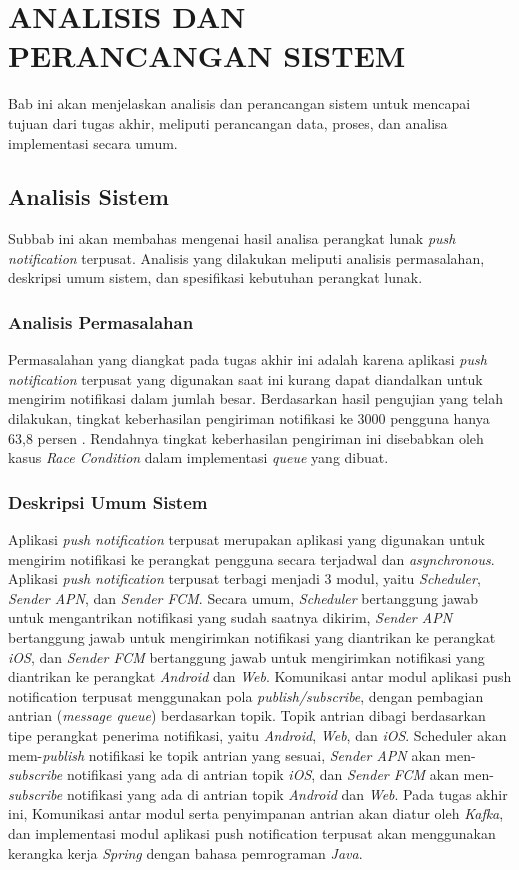 \chapter{ANALISIS DAN PERANCANGAN SISTEM}
Bab ini akan menjelaskan analisis dan perancangan sistem untuk mencapai tujuan dari tugas akhir, meliputi perancangan data, proses, dan analisa implementasi secara umum.

\section{Analisis Sistem}
Subbab ini akan membahas mengenai hasil analisa perangkat lunak \textit{push notification} terpusat. Analisis yang dilakukan meliputi analisis permasalahan, deskripsi umum sistem, dan spesifikasi kebutuhan perangkat lunak.

\subsection{Analisis Permasalahan}
Permasalahan yang diangkat pada tugas akhir ini adalah karena aplikasi \textit{push notification} terpusat yang digunakan saat ini kurang dapat diandalkan untuk mengirim notifikasi dalam jumlah besar. Berdasarkan hasil pengujian yang telah dilakukan, tingkat keberhasilan pengiriman notifikasi ke 3000 pengguna hanya 63,8 persen \cite{application-thesis}. Rendahnya tingkat keberhasilan pengiriman ini disebabkan oleh kasus \textit{Race Condition} dalam implementasi \textit{queue} yang dibuat.

\subsection{Deskripsi Umum Sistem}
Aplikasi \textit{push notification} terpusat merupakan aplikasi yang digunakan untuk mengirim notifikasi ke perangkat pengguna secara terjadwal dan \textit{asynchronous}.
Aplikasi \textit{push notification} terpusat terbagi menjadi 3 modul, yaitu \textit{Scheduler}, \textit{Sender APN}, dan \textit{Sender FCM}. Secara umum, \textit{Scheduler} bertanggung jawab untuk mengantrikan notifikasi yang sudah saatnya dikirim, \textit{Sender APN} bertanggung jawab untuk mengirimkan notifikasi yang diantrikan ke perangkat \textit{iOS}, dan \textit{Sender FCM} bertanggung jawab untuk mengirimkan notifikasi yang diantrikan ke perangkat \textit{Android} dan \textit{Web}.
Komunikasi antar modul aplikasi push notification terpusat menggunakan pola \textit{publish/subscribe}, dengan pembagian antrian (\textit{message queue}) berdasarkan topik. Topik antrian dibagi berdasarkan tipe perangkat penerima notifikasi, yaitu \textit{Android}, \textit{Web}, dan \textit{iOS}. Scheduler akan mem-\textit{publish} notifikasi ke topik antrian yang sesuai, \textit{Sender APN} akan men-\textit{subscribe} notifikasi yang ada di antrian topik \textit{iOS}, dan \textit{Sender FCM} akan men-\textit{subscribe} notifikasi yang ada di antrian topik \textit{Android} dan \textit{Web}.
Pada tugas akhir ini, Komunikasi antar modul serta penyimpanan antrian akan diatur oleh \textit{Kafka}, dan implementasi modul aplikasi push notification terpusat akan menggunakan kerangka kerja \textit{Spring} dengan bahasa pemrograman \textit{Java}.

